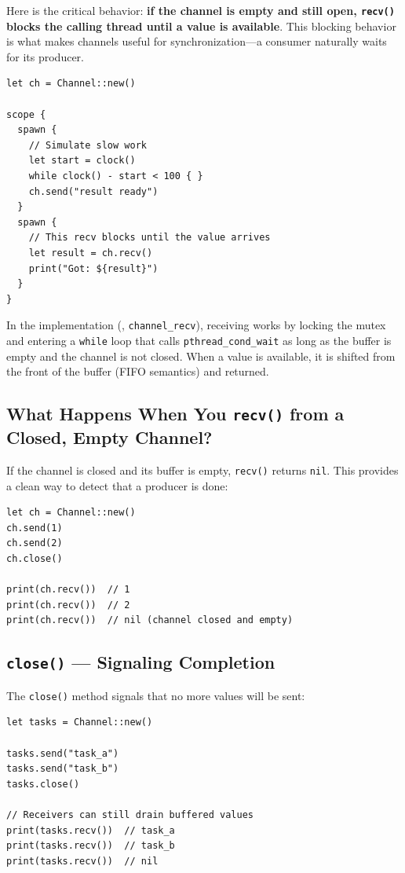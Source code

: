 Here is the critical behavior: \textbf{if the channel is empty and still open, \lstinline|recv()| blocks the calling thread until a value is available}.
This blocking behavior is what makes channels useful for synchronization---a consumer naturally waits for its producer.

\begin{lstlisting}[language=Lattice, caption={Blocking recv}]
let ch = Channel::new()

scope {
  spawn {
    // Simulate slow work
    let start = clock()
    while clock() - start < 100 { }
    ch.send("result ready")
  }
  spawn {
    // This recv blocks until the value arrives
    let result = ch.recv()
    print("Got: ${result}")
  }
}
\end{lstlisting}

In the implementation (, \texttt{channel\_recv}), receiving works by locking the mutex and entering a \texttt{while} loop that calls \texttt{pthread\_cond\_wait} as long as the buffer is empty and the channel is not closed.
When a value is available, it is shifted from the front of the buffer (FIFO semantics) and returned.

\subsection{What Happens When You \texttt{recv()} from a Closed, Empty Channel?}

If the channel is closed and its buffer is empty, \lstinline|recv()| returns \lstinline|nil|.
This provides a clean way to detect that a producer is done:

\begin{lstlisting}[language=Lattice, caption={Receiving from a closed channel}]
let ch = Channel::new()
ch.send(1)
ch.send(2)
ch.close()

print(ch.recv())  // 1
print(ch.recv())  // 2
print(ch.recv())  // nil (channel closed and empty)
\end{lstlisting}

\subsection{\texttt{close()} --- Signaling Completion}


The \lstinline|close()| method signals that no more values will be sent:

\begin{lstlisting}[language=Lattice, caption={Closing a channel}]
let tasks = Channel::new()

tasks.send("task_a")
tasks.send("task_b")
tasks.close()

// Receivers can still drain buffered values
print(tasks.recv())  // task_a
print(tasks.recv())  // task_b
print(tasks.recv())  // nil
\end{lstlisting}

